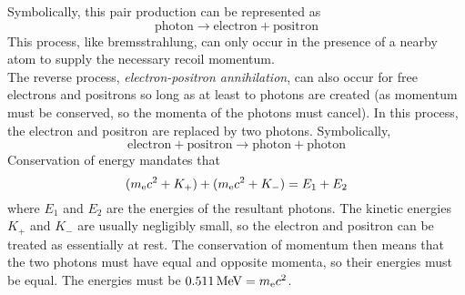 \documentclass{subfiles}
\begin{document}
				Symbolically, this pair production can be represented as
				\[\mathrm{photon \to electron + positron} \tag{pair production}\]
				This process, like bremsstrahlung, can only occur in the presence of a nearby atom to supply the necessary recoil momentum. \\
				The reverse process, \textit{electron-positron annihilation}, can also occur for free electrons and positrons so long as at least to photons are created (as momentum must be conserved, so the momenta of the photons must cancel). In this process, the electron and positron are replaced by two photons. Symbolically,
				\[\mathrm{electron + positron \to photon + photon} \tag{electron-positron annihilation}\]
				Conservation of energy mandates that
				\[(m_{\text{e}}c^2 + K_+) + (m_{\text{e}}c^2 + K_-) = E_1 + E_2\]
				where \(E_1\) and \(E_2\) are the energies of the resultant photons. The kinetic energies \(K_+\) and \(K_-\) are usually negligibly small, so the electron and positron can be treated as essentially at rest. The conservation of momentum then means that the two photons must have equal and opposite momenta, so their energies must be equal. The energies must be \(\SI{0.511}{MeV} = m_{\text{e}}c^2\).
\end{document}
